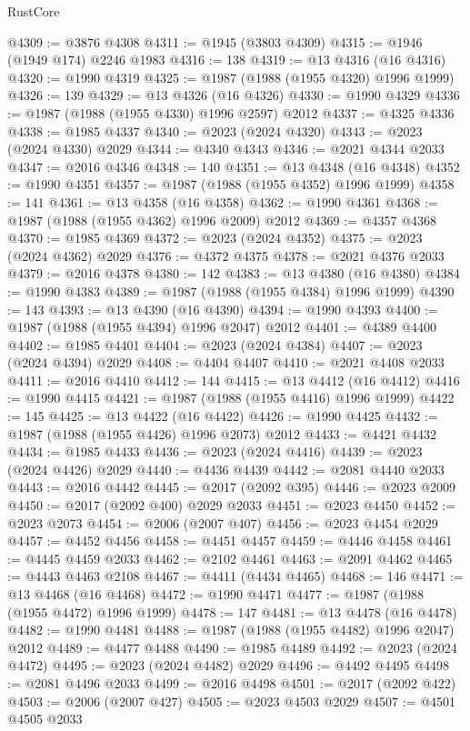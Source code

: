 \begin{lexlean}{RustCore}
\begin{coremodule}
@4309 := @3876 @4308
@4311 := @1945 (@3803 @4309)
@4315 := @1946 (@1949 @174) @2246 @1983
@4316 := 138
@4319 := @13 @4316 (@16 @4316)
@4320 := @1990 @4319
@4325 := @1987 (@1988 (@1955 @4320) @1996 @1999)
@4326 := 139
@4329 := @13 @4326 (@16 @4326)
@4330 := @1990 @4329
@4336 := @1987 (@1988 (@1955 @4330) @1996 @2597) @2012
@4337 := @4325 @4336
@4338 := @1985 @4337
@4340 := @2023 (@2024 @4320)
@4343 := @2023 (@2024 @4330) @2029
@4344 := @4340 @4343
@4346 := @2021 @4344 @2033
@4347 := @2016 @4346
@4348 := 140
@4351 := @13 @4348 (@16 @4348)
@4352 := @1990 @4351
@4357 := @1987 (@1988 (@1955 @4352) @1996 @1999)
@4358 := 141
@4361 := @13 @4358 (@16 @4358)
@4362 := @1990 @4361
@4368 := @1987 (@1988 (@1955 @4362) @1996 @2009) @2012
@4369 := @4357 @4368
@4370 := @1985 @4369
@4372 := @2023 (@2024 @4352)
@4375 := @2023 (@2024 @4362) @2029
@4376 := @4372 @4375
@4378 := @2021 @4376 @2033
@4379 := @2016 @4378
@4380 := 142
@4383 := @13 @4380 (@16 @4380)
@4384 := @1990 @4383
@4389 := @1987 (@1988 (@1955 @4384) @1996 @1999)
@4390 := 143
@4393 := @13 @4390 (@16 @4390)
@4394 := @1990 @4393
@4400 := @1987 (@1988 (@1955 @4394) @1996 @2047) @2012
@4401 := @4389 @4400
@4402 := @1985 @4401
@4404 := @2023 (@2024 @4384)
@4407 := @2023 (@2024 @4394) @2029
@4408 := @4404 @4407
@4410 := @2021 @4408 @2033
@4411 := @2016 @4410
@4412 := 144
@4415 := @13 @4412 (@16 @4412)
@4416 := @1990 @4415
@4421 := @1987 (@1988 (@1955 @4416) @1996 @1999)
@4422 := 145
@4425 := @13 @4422 (@16 @4422)
@4426 := @1990 @4425
@4432 := @1987 (@1988 (@1955 @4426) @1996 @2073) @2012
@4433 := @4421 @4432
@4434 := @1985 @4433
@4436 := @2023 (@2024 @4416)
@4439 := @2023 (@2024 @4426) @2029
@4440 := @4436 @4439
@4442 := @2081 @4440 @2033
@4443 := @2016 @4442
@4445 := @2017 (@2092 @395)
@4446 := @2023 @2009
@4450 := @2017 (@2092 @400) @2029 @2033
@4451 := @2023 @4450
@4452 := @2023 @2073
@4454 := @2006 (@2007 @407)
@4456 := @2023 @4454 @2029
@4457 := @4452 @4456
@4458 := @4451 @4457
@4459 := @4446 @4458
@4461 := @4445 @4459 @2033
@4462 := @2102 @4461
@4463 := @2091 @4462
@4465 := @4443 @4463 @2108
@4467 := @4411 (@4434 @4465)
@4468 := 146
@4471 := @13 @4468 (@16 @4468)
@4472 := @1990 @4471
@4477 := @1987 (@1988 (@1955 @4472) @1996 @1999)
@4478 := 147
@4481 := @13 @4478 (@16 @4478)
@4482 := @1990 @4481
@4488 := @1987 (@1988 (@1955 @4482) @1996 @2047) @2012
@4489 := @4477 @4488
@4490 := @1985 @4489
@4492 := @2023 (@2024 @4472)
@4495 := @2023 (@2024 @4482) @2029
@4496 := @4492 @4495
@4498 := @2081 @4496 @2033
@4499 := @2016 @4498
@4501 := @2017 (@2092 @422)
@4503 := @2006 (@2007 @427)
@4505 := @2023 @4503 @2029
@4507 := @4501 @4505 @2033

\end{coremodule}
\end{lexlean}
